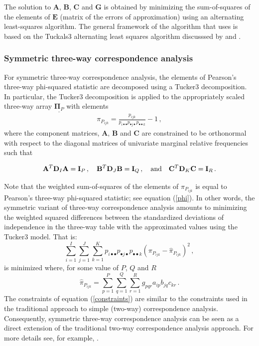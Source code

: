 The solution to ${\mathbf{A}}$, ${\mathbf{B}}$, ${\mathbf{C}}$ and ${\mathbf{G}}$ is obtained by minimizing the sum-of-squares of the elements of $\mathbf{E}$ (matrix of the errors of approximation) using an alternating least-squares algorithm. The general framework of the algorithm that  uses is based on the Tuckals3 alternating least squares algorithm discusssed by \citet{krodel80} and \citet{kro83,kro94}.


\subsubsection{Symmetric three-way correspondence analysis}

For symmetric three-way correspondence analysis, the elements of Pearson's three-way phi-squared statistic are decomposed using a Tucker3 decomposition. In particular, the Tucker3 decomposition is applied to the appropriately scaled three-way array $\underline{\bm{\Pi}_{P}}$ with elements 
\begin{eqnarray}
	\label{eq:PiP}
	\pi_{P_{ijk}}  = \frac{p_{ijk}}{p_{i \bullet \bullet }p_{\bullet j\bullet }p_{\bullet \bullet k}}-1 \,,
\end{eqnarray}
where the component matrices, $\mathbf{A}$, $\mathbf{B}$ and $\mathbf{C}$ are constrained to be orthonormal with respect to the diagonal matrices of univariate marginal relative frequencies such that

\begin{eqnarray}
 \label{constraints}
 \mathbf{A}^T\mathbf{D}_I \mathbf{A} = \mathbf{I}_P\,, \hskip1em \mathbf{B}^T\mathbf{D}_J  \mathbf{B} = \mathbf{I}_Q\,, \hskip1em \text{and} \hskip1em \mathbf{C}^T\mathbf{D}_K  \mathbf{C} = \mathbf{I}_R\,.
\end{eqnarray}

Note that the weighted sum-of-squares of the elements of $\pi_{P_{ijk}}$ is equal to Pearson's three-way phi-squared statistic; see equation (\ref{phi}). In other words, the symmetric variant of three-way correspondence analysis amounts to minimizing the weighted squared differences between the standardized deviations of independence in the three-way table with the approximated values using the Tucker3 model. That is:
\[
\sum_{i=1}^I \sum_{j=1}^J \sum_{k=1}^K p_{i \bullet \bullet} p_{\bullet j \bullet} p_{\bullet \bullet k} \left(\pi_{P_{ijk}} - \widehat{\pi}_{P_{ijk}} \right)^2 \,,
\]
is minimized where, for some value of $P$, $Q$ and $R$
\[
\widehat{\pi}_{P_{ijk}}= \sum_{p=1}^{P}\sum_{q=1}^{Q}\sum_{r=1}^{R}
g_{pqr}a_{ip}b_{jq}c_{kr} \,.
\]
The constraints of equation (\ref{constraints}) are similar to the constraints used in  the traditional approach to simple (two-way) correspondence analysis. Consequently, symmetric three-way correspondence analysis can be seen as a direct extension of the traditional two-way correspondence analysis approach. For more details see, for example, \citet{carkro96}.


